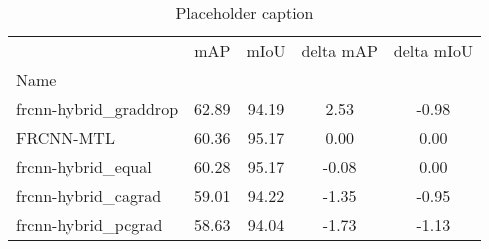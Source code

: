 \begin{table}[htbp]
\centering
\caption{Placeholder caption}
\label{tab:none-grad}
\begin{tabular}{lcccc}
\toprule
 & mAP & mIoU & delta mAP & delta mIoU \\
Name &  &  &  &  \\
\midrule
frcnn-hybrid_graddrop & 62.89 & 94.19 & 2.53 & -0.98 \\
FRCNN-MTL & 60.36 & 95.17 & 0.00 & 0.00 \\
frcnn-hybrid_equal & 60.28 & 95.17 & -0.08 & 0.00 \\
frcnn-hybrid_cagrad & 59.01 & 94.22 & -1.35 & -0.95 \\
frcnn-hybrid_pcgrad & 58.63 & 94.04 & -1.73 & -1.13 \\
\bottomrule
\end{tabular}
\end{table}
